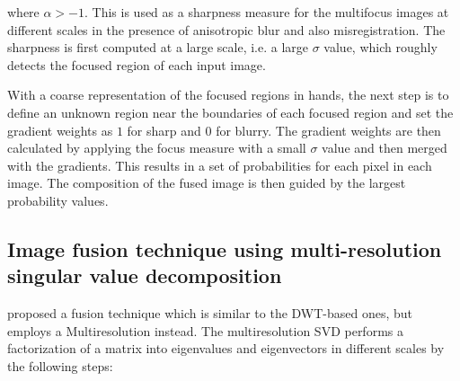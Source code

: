 \noindent where $\alpha > -1$. This is used as a sharpness measure for the multifocus images at different scales in the presence of anisotropic blur and also misregistration. The sharpness is first computed at a large scale, i.e. a large $\sigma$ value, which roughly detects the focused region of each input image.

With a coarse representation of the focused regions in hands, the next step is to define an unknown region near the boundaries of each focused region and set the gradient weights as $1$ for sharp and $0$ for blurry. The gradient weights are then calculated by applying the focus measure with a small $\sigma$ value and then merged with the gradients. This results in a set of probabilities for each pixel in each image. The composition of the fused image is then guided by the largest probability values.

\subsection{Image fusion technique using multi-resolution singular value decomposition}

 proposed a fusion technique which is similar to the DWT-based ones, but employs a Multiresolution  instead. The multiresolution SVD performs a factorization of a matrix into eigenvalues and eigenvectors in different scales by the following steps:

